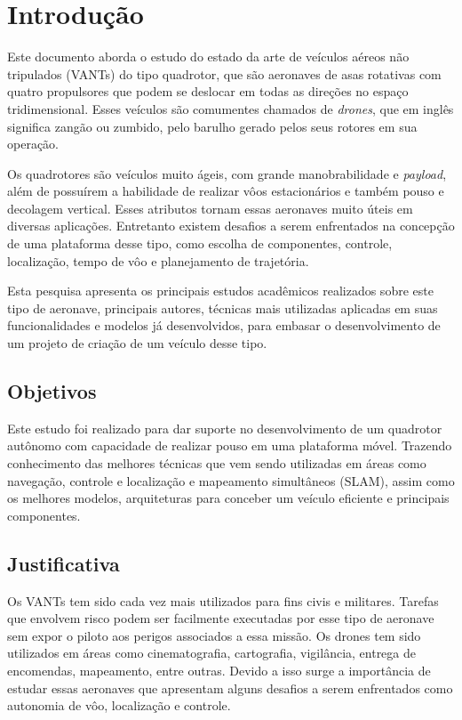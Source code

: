 
\chapter{Introdução}
\label{chap:intro}

Este documento aborda o estudo do estado da arte de veículos aéreos não tripulados (VANTs) do tipo quadrotor, que são aeronaves de asas rotativas com quatro propulsores que podem se deslocar em todas as direções no espaço tridimensional. Esses veículos são comumentes chamados de \textit{drones}, que em inglês significa zangão ou zumbido, pelo barulho gerado pelos seus rotores em sua operação.

Os quadrotores são veículos muito ágeis, com grande manobrabilidade e \textit{payload}, além de possuírem a habilidade de realizar vôos estacionários e também pouso e decolagem vertical. Esses atributos tornam essas aeronaves muito úteis em diversas aplicações. Entretanto existem desafios a serem enfrentados na concepção de uma plataforma desse tipo, como  escolha de componentes, controle, localização, tempo de vôo e planejamento de trajetória.

Esta pesquisa apresenta os principais estudos acadêmicos realizados sobre este tipo de aeronave, principais autores, técnicas mais utilizadas aplicadas em suas funcionalidades e modelos já desenvolvidos, para embasar o desenvolvimento de um projeto de criação de um veículo desse tipo.

\section{Objetivos}
\label{sec:obj}

Este estudo foi realizado para dar suporte no desenvolvimento de um quadrotor autônomo com capacidade de realizar pouso em uma plataforma móvel. Trazendo conhecimento das melhores técnicas que vem sendo utilizadas em áreas como navegação, controle e localização e mapeamento simultâneos (SLAM), assim como os melhores modelos, arquiteturas para conceber um veículo eficiente e principais componentes.

\section{Justificativa}
\label{sec:justi}

Os VANTs tem sido cada vez mais utilizados para fins civis e militares. Tarefas que envolvem risco podem ser facilmente executadas por esse tipo de aeronave sem expor o piloto aos perigos associados a essa missão. Os drones tem sido utilizados em áreas como cinematografia, cartografia, vigilância, entrega de encomendas, mapeamento, entre outras. Devido a isso surge a importância de estudar essas aeronaves que apresentam alguns desafios a serem enfrentados como autonomia de vôo, localização e controle.

